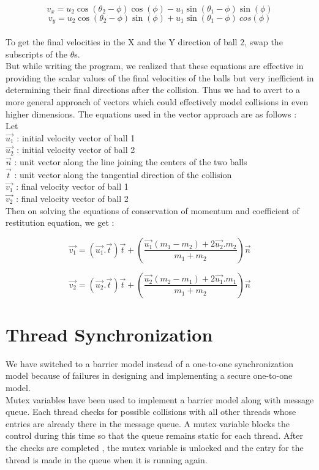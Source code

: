 $$v_x = u_2\cos(\theta_2 - \phi)\cos(\phi) - u_1\sin(\theta_1 - \phi)\sin(\phi) $$
$$v_y = u_2\cos(\theta_2 - \phi)\sin(\phi) + u_1\sin(\theta_1 - \phi)\ cos(\phi)$$
\\
To get the final velocities in the X and the Y direction of ball 2, swap the subscripts of the $\theta$s.
\\But while writing the program, we realized that these equations are effective in providing the scalar values of the final velocities of the balls but very inefficient in determining their final directions after the collision. Thus we had to avert to a more general approach of vectors which could effectively model collisions in even higher dimensions. The equations used in the vector approach are as follows :
\\Let
\\$\vec{u_1}$ : initial velocity vector of ball 1
\\$\vec{u_2}$ : initial velocity vector of ball 2
\\$\vec{n}$ : unit vector along the line joining the centers of the two balls
\\$\vec{t}$ : unit vector along the tangential direction of the collision
\\$\vec{v_1}$ : final velocity vector of ball 1
\\$\vec{v_2}$ : final velocity vector of ball 2
\\Then on solving the equations of conservation of momentum and coefficient of restitution equation, we get :

$$\vec{v_1} = (\vec{u_1}.\vec{t})\vec{t} + (\frac{\vec{u_1}(m_1 - m_2) + 2\vec{u_2}.m_2}{m_1 + m_2})\vec{n} $$


$$\vec{v_2} = (\vec{u_2}.\vec{t})\vec{t} + (\frac{\vec{u_2}(m_2 - m_1) + 2\vec{u_1}.m_1}{m_1 + m_2})\vec{n} $$

\section{Thread Synchronization}

We have switched to a barrier model instead of a one-to-one synchronization model because of failures in designing and implementing a secure one-to-one model.
\\Mutex variables have been used to implement a barrier model along with message queue. Each thread checks for possible collisions with all other threads whose entries are already there in the message queue. A mutex variable blocks the control during this time so that the queue remains static for each thread. After the checks are completed , the mutex variable is unlocked and the entry for the thread is made in the queue when it is running again.



